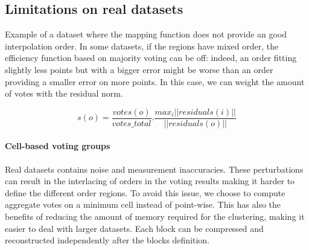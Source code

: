 \documentclass[conference]{IEEEtran}
\theoremstyle{remark}
\begin{document}
\subsection{Limitations on real datasets}

Example of a dataset where the mapping function does not provide an good interpolation order.
In some datasets, if the regions have mixed order, the efficiency function based on majority voting can be off:
indeed, an order fitting slightly less points but with a bigger error might be worse than an order providing a smaller error on more points.
In this case, we can weight the amount of votes with the residual norm.

\[ s(o) = \frac{votes(o)}{votes\_total}. \frac{max_{i}||residuals(i)||}{||residuals(o)||}   \]



\paragraph{Cell-based voting groups}

Real datasets contains noise and measurement inaccuracies. These perturbations can result in the interlacing of orders in the voting results making it harder to define the different order regions.
To avoid this issue, we choose to compute aggregate votes on a minimum cell instead of point-wise.
This has also the benefits of reducing the amount of memory required for the clustering, making it easier to deal with larger datasets. Each block can be compressed and reconstructed independently after the blocks definition.
\end{document}
